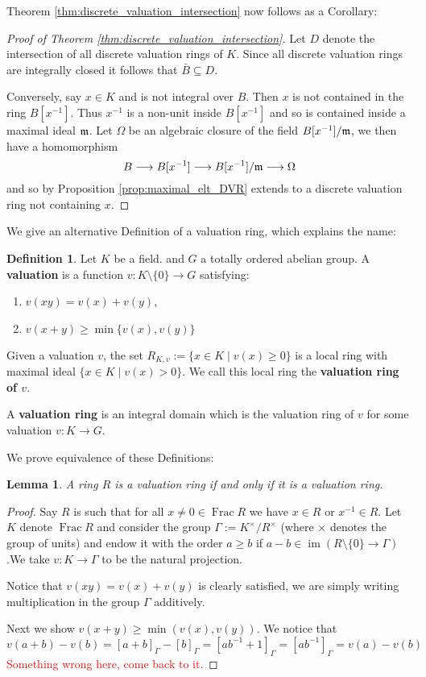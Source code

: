 \documentclass[12pt]{article}
\theoremstyle{plain}
\newtheorem{lemma}[thm]{Lemma}
\theoremstyle{definition}
\newtheorem{defn}[thm]{Definition} %
\newcommand{\lto}{\longrightarrow}
\begin{document}
	Theorem \ref{thm:discrete_valuation_intersection} now follows as a Corollary:
	\begin{proof}[Proof of Theorem \ref{thm:discrete_valuation_intersection}]
		Let $D$ denote the intersection of all discrete valuation rings of $K$. Since all discrete valuation rings are integrally closed it follows that $\bar{B} \subseteq D$.
		
		Conversely, say $x \in K$ and is not integral over $B$. Then $x$ is not contained in the ring $B[x^{-1}]$. Thus $x^{-1}$ is a non-unit inside $B[x^{-1}]$ and so is contained inside a maximal ideal $\frak{m}$. Let $\Omega$ be an algebraic closure of the field $B[x^{-1}]/\frak{m}$, we then have a homomorphism \[B \lto B[x^{-1}] \lto B[x^{-1}]/\frak{m} \lto \Omega\]
		and so by Proposition \ref{prop:maximal_elt_DVR} extends to a discrete valuation ring not containing $x$.
	\end{proof}
	We give an alternative Definition of a valuation ring, which explains the name:
	\begin{defn}
		Let $K$ be a field. and $G$ a totally ordered abelian group. A \textbf{valuation} is a function $v: K\setminus\lbrace 0 \rbrace \lto G$ satisfying:
		\begin{enumerate}
			\item $v(xy) = v(x) + v(y)$,
			\item $v(x + y) \geq \operatorname{min}\lbrace v(x), v(y)\rbrace$
		\end{enumerate}
		Given a valuation $v$, the set $R_{K,v} := \lbrace x \in K \mid v(x) \geq 0\rbrace$ is a local ring with maximal ideal $\lbrace x \in K \mid v(x) > 0 \rbrace$. We call this local ring the \textbf{valuation ring of $v$}. 
		
		A \textbf{valuation ring} is an integral domain which is the valuation ring of $v$ for some valuation $v: K \lto G$.
	\end{defn}
	We prove equivalence of these Definitions:
	\begin{lemma}
		A ring $R$ is a valuation ring if and only if it is a valuation ring.
	\end{lemma}
	\begin{proof}
		Say $R$ is such that for all $x \neq 0 \in \operatorname{Frac}R$ we have $x \in R$ or $x^{-1} \in R$. Let $K$ denote $\operatorname{Frac}R$ and consider the group $\Gamma := K^{\times}/R^\times$ (where $\times$ denotes the group of units) and endow it with the order $a \geq b$ if $a - b \in \operatorname{im}(R\setminus\lbrace 0 \rbrace \lto \Gamma)$.We take $v: K \lto \Gamma$ to be the natural projection. 
		
		Notice that $v(xy) = v(x) + v(y)$ is clearly satisfied, we are simply writing multiplication in the group $\Gamma$ additively.
		
		Next we show $v(x + y) \geq \operatorname{min}(v(x),v(y))$. We notice that
		\begin{equation}
			v(a + b) - v(b) = [a + b]_\Gamma - [b]_\Gamma = [ab^{-1} + 1]_\Gamma = [ab^{-1}]_\Gamma = v(a) - v(b)
		\end{equation}
		\textcolor{red}{Something wrong here, come back to it.}
	\end{proof}
\end{document}

